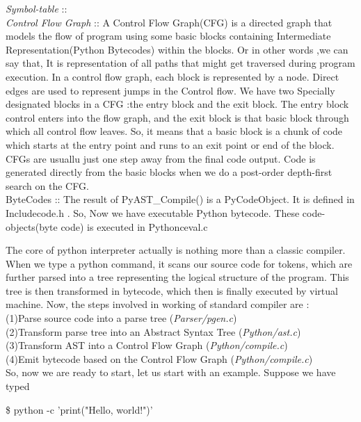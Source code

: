 \textit{Symbol-table}	::	
\\
\linebreak
\textit{Control Flow Graph}	::	A Control Flow Graph(CFG) is a directed graph that models the flow of program using some basic blocks containing Intermediate Representation(Python Bytecodes) within the blocks. Or in other words ,we can say that, It is  representation of all paths that might get traversed during program execution. In a control flow graph, each block is represented by a node. Direct edges are used to represent jumps in the Control flow. We have two Specially designated blocks in a CFG :the entry block and the exit block. The entry block control enters into the flow graph, and the exit block is that basic block through which all control flow leaves. So, it means that a basic block is a chunk of code which starts at the entry point and runs to an exit point or end of the block. CFGs are usuallu just one step away from the final code output. Code is generated directly from the basic blocks when we do a post-order depth-first search on the CFG.
\\
\linebreak
ByteCodes	::	The result of PyAST\_Compile() is a PyCodeObject. It is defined in Includecode.h . So, Now we have executable Python bytecode. These code-objects(byte code) is executed in Pythonceval.c
\\
\linebreak

The core of python interpreter actually is nothing more than a classic compiler. When we type a python command, it scans our source code for tokens, which are further parsed into a tree representing the logical structure of the program. This tree is then transformed in bytecode, which then is finally executed by virtual machine.
Now, the steps involved in working of standard compiler are :\\
(1)Parse source code into a parse tree (\textit{Parser/pgen.c})\\
(2)Transform parse tree into an Abstract Syntax Tree (\textit{Python/ast.c})\\
(3)Transform AST into a Control Flow Graph (\textit{Python/compile.c})\\
(4)Emit bytecode based on the Control Flow Graph (\textit{Python/compile.c})\\


So, now we are ready to start, let us start with an example. Suppose we have typed 
\begin{code}
\$ python -c 'print("Hello, world!")' 
\end{code}

